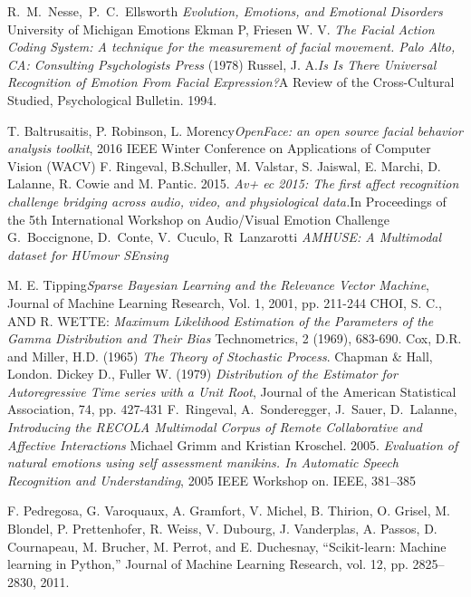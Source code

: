 \documentclass[10pt,journal,compsoc]{IEEEtran}
\begin{document}
\begin{thebibliography}{1}
R.~M.~Nesse,~P.~C.~Ellsworth\emph{ Evolution, Emotions, and Emotional Disorders } University of Michigan Emotions
Ekman P, Friesen W. V. \emph{The Facial Action Coding System: A technique for the measurement of facial movement. Palo Alto, CA: Consulting Psychologists Press} (1978)
 Russel, J. A.\emph{Is Is There Universal Recognition of Emotion From Facial Expression?}A Review of the Cross-Cultural Studied, Psychological Bulletin. 1994.

T. Baltrusaitis, P. Robinson, L. Morency\emph{OpenFace: an open source facial behavior analysis toolkit}, 2016 IEEE Winter Conference on Applications of Computer Vision (WACV)
F. Ringeval, B.Schuller, M. Valstar, S. Jaiswal, E. Marchi,
D. Lalanne, R. Cowie and M. Pantic. 2015. \emph{Av+ ec 2015: The first affect recognition challenge bridging across audio, video, and physiological data.}In Proceedings of the 5th International Workshop on Audio/Visual Emotion Challenge
G.~Boccignone, D.~Conte, V.~Cuculo, R~Lanzarotti\emph{ AMHUSE: A Multimodal dataset for HUmour SEnsing}

M. E. Tipping\emph{Sparse Bayesian Learning and the Relevance Vector Machine}, Journal of Machine Learning Research, Vol. 1, 2001, pp. 211-244
CHOI, S. C., AND R. WETTE: \emph{Maximum Likelihood Estimation of the Parameters of the Gamma Distribution and Their Bias} Technometrics, 2 (1969), 683-690.
Cox, D.R. and Miller, H.D. (1965) \emph{The Theory of Stochastic Process}. Chapman & Hall, London.
Dickey D., Fuller W. (1979) \emph{Distribution of the Estimator for Autoregressive Time series with a Unit Root}, Journal of the American Statistical Association, 74, pp. 427-431
F.~Ringeval, A.~Sonderegger, J.~Sauer, D.~Lalanne,\emph{ Introducing the RECOLA Multimodal Corpus of Remote Collaborative and Affective Interactions}
Michael Grimm and Kristian Kroschel. 2005. \emph{Evaluation of natural emotions using
self assessment manikins. In Automatic Speech Recognition and Understanding},
2005 IEEE Workshop on. IEEE, 381–385

F. Pedregosa, G. Varoquaux, A. Gramfort, V. Michel, B. Thirion,
O. Grisel, M. Blondel, P. Prettenhofer, R. Weiss, V. Dubourg, J. Vanderplas, A. Passos, D. Cournapeau, M. Brucher, M. Perrot, and
E. Duchesnay, “Scikit-learn: Machine learning in Python,” Journal
of Machine Learning Research, vol. 12, pp. 2825–2830, 2011.
\end{thebibliography}
\end{document}

